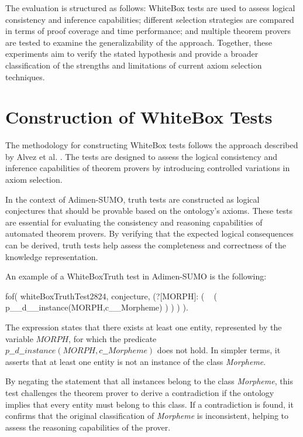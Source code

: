 \documentclass[english,version-2020-11]{uzl-thesis}
\begin{document}
The evaluation is structured as follows: WhiteBox tests are used to assess logical consistency and inference capabilities; different selection strategies are compared in terms of proof coverage and time performance; and multiple theorem provers are tested to examine the generalizability of the approach. Together, these experiments aim to verify the stated hypothesis and provide a broader classification of the strengths and limitations of current axiom selection techniques.


\section{Construction of WhiteBox Tests}

The methodology for constructing WhiteBox tests follows the approach described by Alvez et al. \cite{Alvez2017}. The tests are designed to assess the logical consistency and inference capabilities of theorem provers by introducing controlled variations in axiom selection.

In the context of Adimen-SUMO, truth tests are constructed as logical conjectures that should be provable based on the ontology's axioms. These tests are essential for evaluating the consistency and reasoning capabilities of automated theorem provers. By verifying that the expected logical consequences can be derived, truth tests help assess the completeness and correctness of the knowledge representation. 

An example of a WhiteBoxTruth test in Adimen-SUMO is the following:

\begin{Pseudocode}[morekeywords = {add, create}, deletekeywords={to}, numbers=left,
    caption = {WhiteboxTruth test example}]
    fof( whiteBoxTruthTest2824, conjecture,
        (?[MORPH]: 
            (
                ~ (
                    p__d__instance(MORPH,c__Morpheme)
                )
            )
        )
    ).
\end{Pseudocode}


The expression states that there exists at least one entity, represented by the variable \( MORPH \), for which the predicate \( p\_\_d\_\_instance(MORPH, c\_\_Morpheme) \) does not hold. In simpler terms, it asserts that at least one entity is not an instance of the class \textit{Morpheme}.

By negating the statement that all instances belong to the class \textit{Morpheme}, this test challenges the theorem prover to derive a contradiction if the ontology implies that every entity must belong to this class. If a contradiction is found, it confirms that the original classification of \textit{Morpheme} is inconsistent, helping to assess the reasoning capabilities of the prover.
\end{document}

